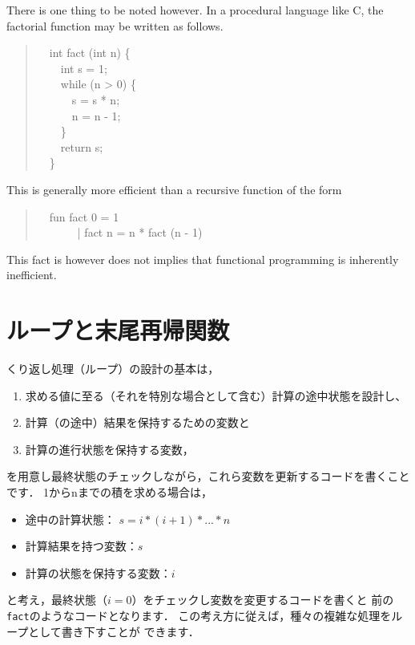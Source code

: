 \documentclass{jbook}
\newif\ifjp
\newcommand{\txt}[2]{#1}
\newcommand{\myem}{\mbox{\ \ }}
\newenvironment{program}{\begin{quote}\begin{tt}}%
                        {\end{tt}\end{quote}}
\begin{document}
	There is one thing to be noted however.
	In a procedural language like C, the factorial function may be
written as follows.
\begin{program}
\myem int fact (int n) \{\\
\myem\myem   int s = 1;\\
\myem\myem   while (n > 0) \{\\
\myem\myem\myem     s = s * n;\\
\myem\myem\myem     n = n - 1;\\
\myem\myem   \}\\
\myem\myem  return s;\\
\myem \}
\end{program}
	This is generally more efficient than a recursive function of
the form
\begin{program}
\myem fun fact 0 = 1\\
\myem \ \ \ \ \ | fact n = n * fact (n - 1)
\end{program}
	This fact is however does not implies that functional
programming is inherently inefficient.
\fi%

\section{\txt{ループと末尾再帰関数}{Loop and tail recursion}}
\label{sec:tutorialTailcall}

\ifjp%
	くり返し処理（ループ）の設計の基本は，
\begin{enumerate}
\item 
求める値に至る（それを特別な場合として含む）計算の途中状態を設計し、
\item 
計算（の途中）結果を保持するための変数と
\item 
計算の進行状態を保持する変数，
\end{enumerate}
を用意し最終状態のチェックしながら，これら変数を更新するコードを書くこと
です．
	1からnまでの積を求める場合は，
\begin{itemize}
\item 
途中の計算状態：
$s = i * (i + 1) * ... * n$
\item 
計算結果を持つ変数：$s$
\item 
計算の状態を保持する変数：$i$
\end{itemize}
と考え，最終状態（$i = 0$）をチェックし変数を変更するコードを書くと
前の{\tt fact}のようなコードとなります．
	この考え方に従えば，種々の複雑な処理をループとして書き下すことが
できます．
\end{document}
